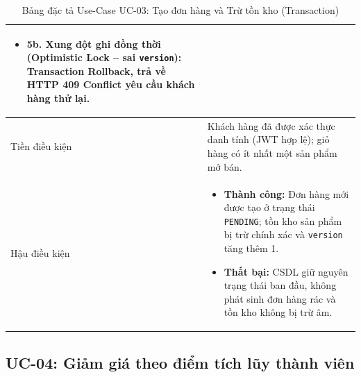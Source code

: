 \documentclass[12pt,a4paper]{article}
\begin{document}
\begin{table}[H]
\begin{tabularx}{\textwidth}{|>{\bfseries\raggedright\arraybackslash}p{3.2cm}|>{\raggedright\arraybackslash}X|}
\begin{itemize}[leftmargin=*,itemsep=2pt,topsep=2pt,parsep=0pt,partopsep=0pt]
    \item \textbf{5b. Xung đột ghi đồng thời (Optimistic Lock -- sai \texttt{version}):} Transaction Rollback, trả về HTTP 409 Conflict yêu cầu khách hàng thử lại.
\end{itemize} \\
\hline
Tiền điều kiện & Khách hàng đã được xác thực danh tính (JWT hợp lệ); giỏ hàng có ít nhất một sản phẩm mở bán. \\
\hline
Hậu điều kiện & 
\begin{itemize}[leftmargin=*,itemsep=2pt,topsep=2pt,parsep=0pt,partopsep=0pt]
    \item \textbf{Thành công:} Đơn hàng mới được tạo ở trạng thái \texttt{PENDING}; tồn kho sản phẩm bị trừ chính xác và \texttt{version} tăng thêm 1.
    \item \textbf{Thất bại:} CSDL giữ nguyên trạng thái ban đầu, không phát sinh đơn hàng rác và tồn kho không bị trừ âm.
\end{itemize} \\
\hline
\end{tabularx}
\caption{Bảng đặc tả Use-Case UC-03: Tạo đơn hàng và Trừ tồn kho (Transaction)}
\label{tab:uc-03}
\end{table}

\subsection{UC-04: Giảm giá theo điểm tích lũy thành viên}
\end{document}
